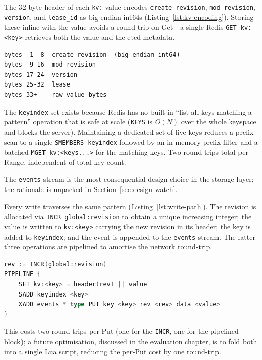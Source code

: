 The 32-byte header of each \texttt{kv:} value encodes \texttt{create\_revision}, \texttt{mod\_revision}, \texttt{version}, and \texttt{lease\_id} as big-endian int64s (Listing~\ref{lst:kv-encoding}). Storing these inline with the value avoids a round-trip on Get---a single Redis \texttt{GET kv:<key>} retrieves both the value and the etcd metadata.

\begin{lstlisting}[caption={\texttt{kv:} value encoding (excerpt from \texttt{store/redis.go}).},label=lst:kv-encoding]
bytes  1- 8  create_revision  (big-endian int64)
bytes  9-16  mod_revision
bytes 17-24  version
bytes 25-32  lease
bytes 33+    raw value bytes
\end{lstlisting}

The \texttt{keyindex} set exists because Redis has no built-in ``list all keys matching a pattern'' operation that is safe at scale (\texttt{KEYS} is $O(N)$ over the whole keyspace and blocks the server). Maintaining a dedicated set of live keys reduces a prefix scan to a single \texttt{SMEMBERS keyindex} followed by an in-memory prefix filter and a batched \texttt{MGET kv:<keys...>} for the matching keys. Two round-trips total per Range, independent of total key count.

The \texttt{events} stream is the most consequential design choice in the storage layer; the rationale is unpacked in Section~\ref{sec:design-watch}.

Every write traverses the same pattern (Listing~\ref{lst:write-path}). The revision is allocated via \texttt{INCR global:revision} to obtain a unique increasing integer; the value is written to \texttt{kv:<key>} carrying the new revision in its header; the key is added to \texttt{keyindex}; and the event is appended to the \texttt{events} stream. The latter three operations are pipelined to amortise the network round-trip.

\begin{lstlisting}[language=Go,caption={Write path (simplified).},label=lst:write-path]
rev := INCR(global:revision)
PIPELINE {
    SET kv:<key> = header(rev) || value
    SADD keyindex <key>
    XADD events * type PUT key <key> rev <rev> data <value>
}
\end{lstlisting}

This costs two round-trips per Put (one for the \texttt{INCR}, one for the pipelined block); a future optimisation, discussed in the evaluation chapter, is to fold both into a single Lua script, reducing the per-Put cost by one round-trip.

